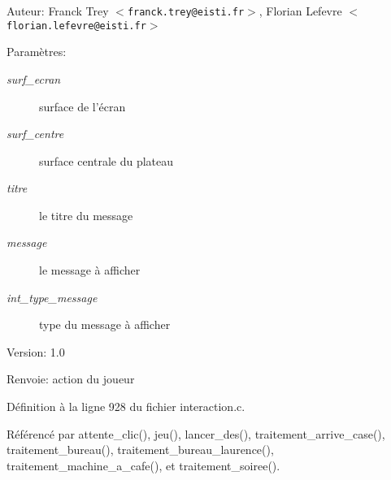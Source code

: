\begin{Desc}
\item[Auteur:]Franck Trey $<${\tt franck.trey@eisti.fr}$>$, Florian Lefevre $<${\tt florian.lefevre@eisti.fr}$>$\end{Desc}
\begin{Desc}
\item[Param\`{e}tres:]
\begin{description}
\item[{\em surf\_\-ecran}]surface de l'\'{e}cran \item[{\em surf\_\-centre}]surface centrale du plateau \item[{\em titre}]le titre du message \item[{\em message}]le message \`{a} afficher \item[{\em int\_\-type\_\-message}]type du message \`{a} afficher\end{description}
\end{Desc}
\begin{Desc}
\item[Version:]1.0 \end{Desc}
\begin{Desc}
\item[Renvoie:]action du joueur \end{Desc}


D\'{e}finition \`{a} la ligne 928 du fichier interaction.c.

R\'{e}f\'{e}renc\'{e} par attente\_\-clic(), jeu(), lancer\_\-des(), traitement\_\-arrive\_\-case(), traitement\_\-bureau(), traitement\_\-bureau\_\-laurence(), traitement\_\-machine\_\-a\_\-cafe(), et traitement\_\-soiree().

